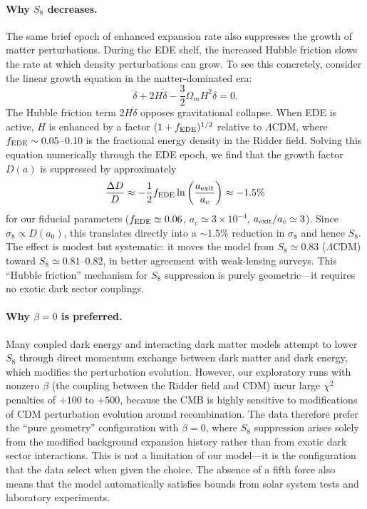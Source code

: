 \documentclass[a4paper,11pt]{article}
\begin{document}
\paragraph{Why $S_8$ decreases.}
The same brief epoch of enhanced expansion rate also suppresses the growth of matter perturbations. During the EDE shelf, the increased Hubble friction slows the rate at which density perturbations can grow. To see this concretely, consider the linear growth equation in the matter-dominated era:
\begin{equation}
\ddot{\delta} + 2H\dot{\delta} - \frac{3}{2}\Omega_m H^2 \delta = 0.
\end{equation}
The Hubble friction term $2H\dot{\delta}$ opposes gravitational collapse. When EDE is active, $H$ is enhanced by a factor $(1 + f_{\rm EDE})^{1/2}$ relative to $\Lambda$CDM, where $f_{\rm EDE} \sim 0.05$--$0.10$ is the fractional energy density in the Ridder field. Solving this equation numerically through the EDE epoch, we find that the growth factor $D(a)$ is suppressed by approximately
\begin{equation}
\frac{\Delta D}{D} \approx -\frac{1}{2} f_{\rm EDE} \ln\left(\frac{a_{\rm exit}}{a_c}\right) \approx -1.5\%
\end{equation}
for our fiducial parameters ($f_{\rm EDE} \simeq 0.06$, $a_c \simeq 3 \times 10^{-4}$, $a_{\rm exit}/a_c \simeq 3$). Since $\sigma_8 \propto D(a_0)$, this translates directly into a $\sim 1.5\%$ reduction in $\sigma_8$ and hence $S_8$. The effect is modest but systematic: it moves the model from $S_8 \simeq 0.83$ ($\Lambda$CDM) toward $S_8 \simeq 0.81$--$0.82$, in better agreement with weak-lensing surveys. This ``Hubble friction'' mechanism for $S_8$ suppression is purely geometric---it requires no exotic dark sector couplings.

\paragraph{Why $\beta = 0$ is preferred.}
Many coupled dark energy and interacting dark matter models attempt to lower $S_8$ through direct momentum exchange between dark matter and dark energy, which modifies the perturbation evolution. However, our exploratory runs with nonzero $\beta$ (the coupling between the Ridder field and CDM) incur large $\chi^2$ penalties of $+100$ to $+500$, because the CMB is highly sensitive to modifications of CDM perturbation evolution around recombination. The data therefore prefer the ``pure geometry'' configuration with $\beta = 0$, where $S_8$ suppression arises solely from the modified background expansion history rather than from exotic dark sector interactions. This is not a limitation of our model---it is the configuration that the data select when given the choice. The absence of a fifth force also means that the model automatically satisfies bounds from solar system tests and laboratory experiments.
\end{document}

